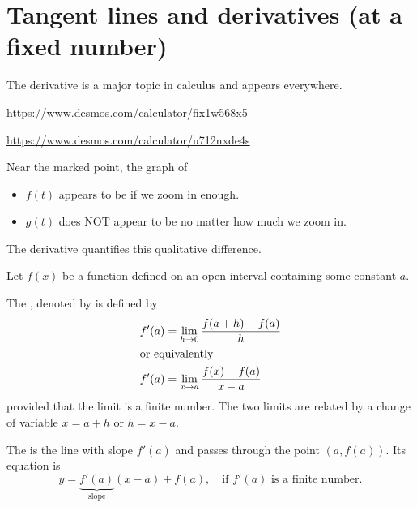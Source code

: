 \documentclass[../main.tex]{subfiles}
\begin{document}
 \section{Tangent lines and derivatives (at a fixed number)}
The derivative is a major topic in calculus and appears everywhere.

\begin{minipage}{0.5\textwidth}
  \centering
  
  \url{https://www.desmos.com/calculator/fix1w568x5}
\end{minipage}
\begin{minipage}{0.5\textwidth}
  \centering
  
  \url{https://www.desmos.com/calculator/u712nxde4s}
\end{minipage}

Near the marked point, the graph of
\begin{itemize}
  \item \(f(t)\) appears to be \underline{\hspace{2in}} if we zoom in enough.
  \item \(g(t)\) does NOT appear to be \underline{\hspace{2in}} no matter how much we zoom in.
\end{itemize}

\medskip
The derivative quantifies this qualitative difference.

\begin{definition} \label{def:derivative-at-a-point}
  Let \(f(x)\) be a function defined on an open interval containing some constant \(a\).

  The , denoted by  is defined by
  \begin{align}
    \label{eq:def-derivative-1}
    f'(a) &= \lim_{h \to 0} \frac{f(a + h) - f(a)}{h} \\
    \intertext{or equivalently}
    \label{eq:def-derivative-2}
    f'(a) &= \lim_{x \to a} \frac{f(x) - f(a)}{x - a}
  \end{align}
  provided that the limit is a finite number. The two limits are related by a change of variable \(x = a + h\) or \(h = x - a\).

  The  is the line with slope \(f'(a)\) and passes through the point \((a, f(a))\). Its equation is
  \[
    y = \underbrace{f'(a)}_{\text{slope}} (x - a) + f(a), \quad\text{if \(f'(a)\) is a finite number.}
  \]

\end{definition}
\end{document}
